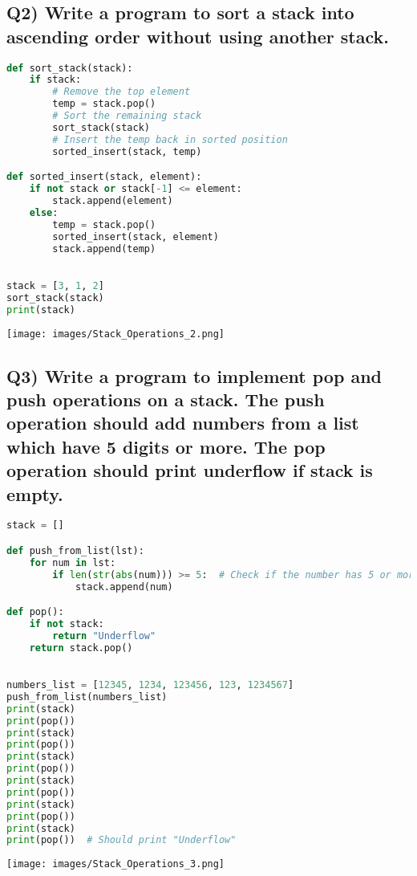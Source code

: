 \documentclass{article}
\begin{document}
\subsection*{Q2) Write a program to sort a stack into ascending order without using another stack.}
\begin{lstlisting}[language=Python]
def sort_stack(stack):
    if stack:
        # Remove the top element
        temp = stack.pop()
        # Sort the remaining stack
        sort_stack(stack)
        # Insert the temp back in sorted position
        sorted_insert(stack, temp)

def sorted_insert(stack, element):
    if not stack or stack[-1] <= element:
        stack.append(element)
    else:
        temp = stack.pop()
        sorted_insert(stack, element)
        stack.append(temp)

 
stack = [3, 1, 2]
sort_stack(stack)
print(stack)
\end{lstlisting}
\texttt{[image: images/Stack\_Operations\_2.png]}

\subsection*{Q3) Write a program to implement pop and push operations on a stack. The push operation should add numbers from a list which have 5 digits or more. The pop operation should print underflow if stack is empty.}
\begin{lstlisting}[language=Python]
stack = []

def push_from_list(lst):
    for num in lst:
        if len(str(abs(num))) >= 5:  # Check if the number has 5 or more digits
            stack.append(num)

def pop():
    if not stack:
        return "Underflow"
    return stack.pop()

 
numbers_list = [12345, 1234, 123456, 123, 1234567]
push_from_list(numbers_list)
print(stack)
print(pop())
print(stack)
print(pop())
print(stack)
print(pop())
print(stack)
print(pop())
print(stack)
print(pop())
print(stack)
print(pop())  # Should print "Underflow"
\end{lstlisting}
\texttt{[image: images/Stack\_Operations\_3.png]}
\end{document}
